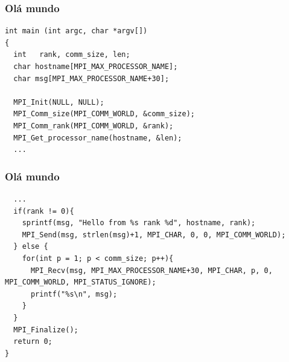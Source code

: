 \documentclass[xcolor={usenames,dvipsnames},12pt,presentation,aspectratio=169]{beamer}
\begin{document}
\begin{frame}[fragile]
  \frametitle{Olá mundo}
\begin{center}
\begin{minipage}{0.95\textwidth}
  \begin{verbatim}
int main (int argc, char *argv[])
{
  int   rank, comm_size, len;
  char hostname[MPI_MAX_PROCESSOR_NAME];
  char msg[MPI_MAX_PROCESSOR_NAME+30];
    
  MPI_Init(NULL, NULL);
  MPI_Comm_size(MPI_COMM_WORLD, &comm_size);
  MPI_Comm_rank(MPI_COMM_WORLD, &rank);
  MPI_Get_processor_name(hostname, &len);
  ...
  \end{verbatim}
\end{minipage}
\end{center}
\end{frame}
\begin{frame}[fragile]
  \frametitle{Olá mundo}
\begin{center}
\begin{minipage}{0.95\textwidth}
  \begin{verbatim}
  ...
  if(rank != 0){
    sprintf(msg, "Hello from %s rank %d", hostname, rank);
    MPI_Send(msg, strlen(msg)+1, MPI_CHAR, 0, 0, MPI_COMM_WORLD);
  } else {
    for(int p = 1; p < comm_size; p++){
      MPI_Recv(msg, MPI_MAX_PROCESSOR_NAME+30, MPI_CHAR, p, 0, MPI_COMM_WORLD, MPI_STATUS_IGNORE);
      printf("%s\n", msg);
    }
  }
  MPI_Finalize();
  return 0;
}    
  \end{verbatim}
\end{minipage}
\end{center}
\end{frame}
\end{document}
